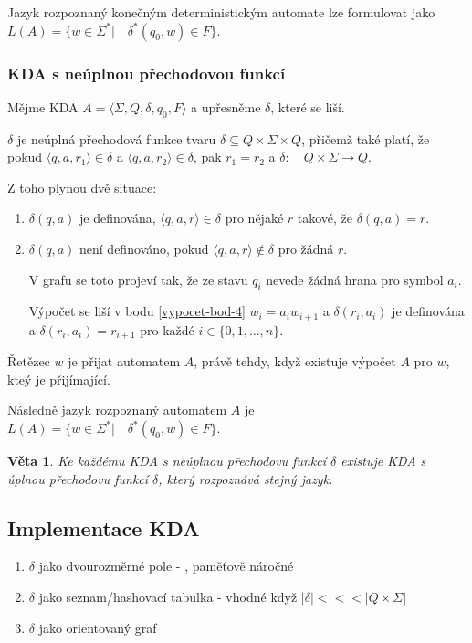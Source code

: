 \documentclass[10pt,a4paper]{article}
\theoremstyle{note}
\newtheorem{veta}{Věta}
\begin{document}
Jazyk rozpoznaný konečným deterministickým automate lze formulovat jako
$L(A) = \lbrace w \in \Sigma^* |\quad \delta^*(q_0,w) \in F \rbrace$.

\subsubsection{KDA s neúplnou přechodovou funkcí}

Mějme KDA $A = \langle \Sigma, Q, \delta, q_0, F \rangle$ a upřesněme $\delta$, které se liší.

$\delta$ je neúplná přechodová funkce tvaru $\delta \subseteq Q \times \Sigma \times Q$, přičemž také platí, že
pokud $\langle q, a, r_1 \rangle \in \delta$ a $\langle q,a,r_2 \rangle \in \delta$, pak $r_1 = r_2$ a $\delta:\quad Q \times \Sigma \rightarrow Q$.

Z toho plynou dvě situace:
\begin{enumerate}
\item
$\delta(q, a)$ je definována, $\langle q,a,r \rangle \in \delta$ pro nějaké $r$ takové, že $\delta(q,a) = r$.

\item
$\delta(q,a)$ není definováno, pokud $\langle q, a, r \rangle \notin \delta$ pro žádná $r$.

V grafu se toto projeví tak, že ze stavu $q_i$ nevede žádná hrana pro symbol $a_i$.

Výpočet se liší v bodu \ref{vypocet-bod-4} $w_i = a_i w_{i+1}$ a $\delta(r_i, a_i)$ je definována a $\delta(r_i,a_i) = r_{i+1}$
pro každé $i \in \lbrace 0,1,\ldots,n \rbrace$.
\end{enumerate}

Řetězec $w$ je přijat automatem $A$, právě tehdy, když existuje výpočet $A$ pro $w$, kteý je přijímající.

Následně jazyk rozpoznaný automatem $A$ je $L(A) = \lbrace w \in \Sigma^*| \quad \delta^*(q_0,w) \in F \rbrace$.

\begin{veta}
Ke každému KDA s neúplnou přechodovu funkcí $\delta$ existuje KDA s úplnou přechodovu funkcí $\delta$, který rozpoznává stejný jazyk.
\end{veta}


\subsection{Implementace KDA}
\begin{enumerate}
\item $\delta$ jako dvourozměrné pole - , paměťově náročné
\item $\delta$ jako seznam/hashovací tabulka - vhodné když $|\delta | <<< |Q\times \Sigma |$
\item $\delta$ jako orientovaný graf
\end{enumerate}
\end{document}
